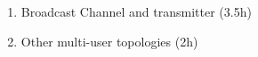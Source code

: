 \documentclass[xcolor=dvipsnames,aspectratio=169]{beamer}
\begin{document}
{\begin{enumerate}
        \item Broadcast Channel and transmitter (3.5h)
        \item Other multi-user topologies (2h)

\end{enumerate}}
\end{document}
